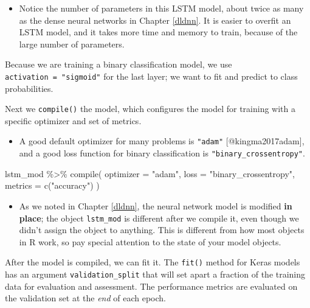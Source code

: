 \documentclass[
]{krantz}
\makeatletter
\newenvironment{Shaded}{\begin{snugshade}}{\end{snugshade}}
\newcommand{\AttributeTok}[1]{\textcolor[rgb]{0.77,0.63,0.00}{#1}}
\newcommand{\ConstantTok}[1]{\textcolor[rgb]{0.00,0.00,0.00}{#1}}
\newcommand{\DecValTok}[1]{\textcolor[rgb]{0.00,0.00,0.81}{#1}}
\newcommand{\FloatTok}[1]{\textcolor[rgb]{0.00,0.00,0.81}{#1}}
\newcommand{\FunctionTok}[1]{\textcolor[rgb]{0.00,0.00,0.00}{#1}}
\newcommand{\NormalTok}[1]{#1}
\newcommand{\OtherTok}[1]{\textcolor[rgb]{0.56,0.35,0.01}{#1}}
\newcommand{\SpecialCharTok}[1]{\textcolor[rgb]{0.00,0.00,0.00}{#1}}
\newcommand{\StringTok}[1]{\textcolor[rgb]{0.31,0.60,0.02}{#1}}
\newenvironment{kframe}{%
\medskip{}
\setlength{\fboxsep}{.8em}
 \def\at@end@of@kframe{}%
 \ifinner\ifhmode%
  \def\at@end@of@kframe{\end{minipage}}%
  \begin{minipage}{\columnwidth}%
 \fi\fi%
 \def\FrameCommand##1{\hskip\@totalleftmargin \hskip-\fboxsep
 \colorbox{shadecolor}{##1}\hskip-\fboxsep
     \hskip-\linewidth \hskip-\@totalleftmargin \hskip\columnwidth}%
 \MakeFramed {\advance\hsize-\width
   \@totalleftmargin\z@ \linewidth\hsize
   \@setminipage}}%
 {\par\unskip\endMakeFramed%
 \at@end@of@kframe}
\renewenvironment{Shaded}{\begin{kframe}}{\end{kframe}}
\newenvironment{rmdblock}[1]
  {\begin{shaded*}
  \begin{itemize}[left = -1cm, labelsep = 1cm]
  \renewcommand{\labelitemi}{
    \raisebox{-.7\height}[0pt][0pt]{
      {\setkeys{Gin}{width=3em,keepaspectratio}\texttt{[image: images/\#1]}}
    }
  }
 
  \item
  }
  {
  \end{itemize}
  \end{shaded*}
  }
\newenvironment{rmdnote}
  {\begin{rmdblock}{note}}
  {\end{rmdblock}}
\newenvironment{rmdwarning}
  {\begin{rmdblock}{warning}}
  {\end{rmdblock}}
\makeatother
\begin{document}
\begin{rmdwarning}
Notice the number of parameters in this LSTM model, about twice as many as the dense neural networks in Chapter \ref{dldnn}. It is easier to overfit an LSTM model, and it takes more time and memory to train, because of the large number of parameters.
\end{rmdwarning}

Because we are training a binary classification model, we use \texttt{activation\ =\ "sigmoid"} for the last layer; we want to fit and predict to class probabilities.

Next we \texttt{compile()} the model, which configures the model for training with a specific optimizer and set of metrics.

\begin{rmdnote}
A good default optimizer for many problems is \texttt{"adam"}
{[}@kingma2017adam{]}, and a good loss function for binary
classification is \texttt{"binary\_crossentropy"}.
\end{rmdnote}

\begin{Shaded}
\begin{Highlighting}[]
\NormalTok{lstm\_mod }\SpecialCharTok{\%\textgreater{}\%}
  \FunctionTok{compile}\NormalTok{(}
    \AttributeTok{optimizer =} \StringTok{"adam"}\NormalTok{,}
    \AttributeTok{loss =} \StringTok{"binary\_crossentropy"}\NormalTok{,}
    \AttributeTok{metrics =} \FunctionTok{c}\NormalTok{(}\StringTok{"accuracy"}\NormalTok{)}
\NormalTok{  )}
\end{Highlighting}
\end{Shaded}

\begin{rmdwarning}
As we noted in Chapter \ref{dldnn}, the neural network model is modified \textbf{in place}; the object \texttt{lstm\_mod} is different after we compile it, even though we didn't assign the object to anything. This is different from how most objects in R work, so pay special attention to the state of your model objects.
\end{rmdwarning}

After the model is compiled, we can fit it. The \texttt{fit()} method for Keras models has an argument \texttt{validation\_split} that will set apart a fraction of the training data for evaluation and assessment. The performance metrics are evaluated on the validation set at the \emph{end} of each epoch.

\begin{Shaded}
\end{Shaded}
\end{document}
